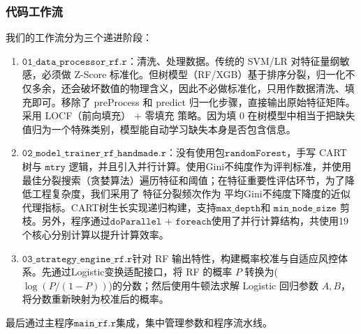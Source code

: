 \documentclass[11pt, a4paper]{article}
\begin{document}
\subsubsection{代码工作流}
我们的工作流分为三个递进阶段：
\begin{enumerate}
  \item $\texttt{01\_data\_processor\_rf.r}$：清洗、处理数据。传统的 SVM/LR 对特征量纲敏感，必须做 Z-Score 标准化。但树模型（RF/XGB）基于排序分裂，归一化不仅多余，还会破坏数值的物理含义，因此不必做标准化，只用作数据清洗、填充即可。移除了 preProcess 和 predict 归一化步骤，直接输出原始特征矩阵。采用 LOCF（前向填充） + 零填充 策略。因为填 0 在树模型中相当于把缺失值归为一个特殊类别，模型能自动学习缺失本身是否包含信息。
  \item $\texttt{02\_model\_trainer\_rf\_handmade.r}$：没有使用包$\texttt{randomForest}$，手写 CART 树与 $\texttt{mtry}$ 逻辑，并且引入并行计算。使用Gini不纯度作为评判标准，并使用最佳分裂搜索（贪婪算法）遍历特征和阈值；在特征重要性评估环节，为了降低工程复杂度，我们采用了 特征分裂频次作为 平均Gini不纯度下降度的近似代理指标。CART树生长实现递归构建，支持$\texttt{max\_depth}$和 $\texttt{min\_node\_size}$ 剪枝。另外，程序通过$\texttt{doParallel + foreach}$使用了并行计算结构，共使用19个核心分别计算以提升计算效率。
  \item $\texttt{03\_strategy\_engine\_rf.r}$针对 RF 输出特性，构建概率校准与自适应风控体系。先通过Logistic变换适配接口，将 RF 的概率 $P$ 转换为($\log(P/(1-P))$)的分数；然后使用牛顿法求解 Logistic 回归参数 $A, B$，将分数重新映射为校准后的概率。
\end{enumerate}
最后通过主程序$\texttt{main\_rf.r}$集成，集中管理参数和程序流水线。
\end{document}
